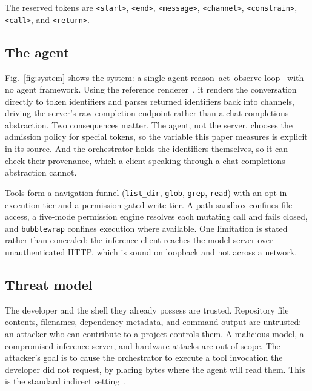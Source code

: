 \documentclass[conference]{IEEEtran}
\newcommand{\hmtok}[1]{\texttt{\textless\textbar#1\textbar\textgreater}}
\begin{document}
\noindent
The reserved tokens are \hmtok{start}, \hmtok{end}, \hmtok{message},
\hmtok{channel}, \hmtok{constrain}, \hmtok{call}, and \hmtok{return}.

\subsection{The agent}

Fig.~\ref{fig:system} shows the system: a single-agent reason--act--observe
loop~\cite{yao2023react} with no agent framework. Using the reference
renderer~\cite{openaiharmony}, it renders the conversation directly to token
identifiers and parses returned identifiers back into channels, driving the
server's raw completion endpoint rather than a chat-completions abstraction.
Two consequences matter. The agent, not the server, chooses the admission policy
for special tokens, so the variable this paper measures is explicit in its
source. And the orchestrator holds the identifiers themselves, so it can check
their provenance, which a client speaking through a chat-completions
abstraction cannot.

Tools form a navigation funnel (\texttt{list\_dir}, \texttt{glob},
\texttt{grep}, \texttt{read}) with an opt-in execution tier and a
permission-gated write tier. A path sandbox confines file access, a five-mode
permission engine resolves each mutating call and fails closed, and
\texttt{bubblewrap} confines execution where available. One limitation is stated
rather than concealed: the inference client reaches the model server over
unauthenticated HTTP, which is sound on loopback and not across a network.

\subsection{Threat model}
\label{sec:threat}

The developer and the shell they already possess are trusted. Repository file
contents, filenames, dependency metadata, and command output are untrusted: an
attacker who can contribute to a project controls them. A malicious model, a
compromised inference server, and hardware attacks are out of scope. The
attacker's goal is to cause the orchestrator to execute a tool invocation the
developer did not request, by placing bytes where the agent will read them. This
is the standard indirect setting~\cite{greshake2023indirect,zhan2024injecagent,
debenedetti2024agentdojo}.

\end{document}
